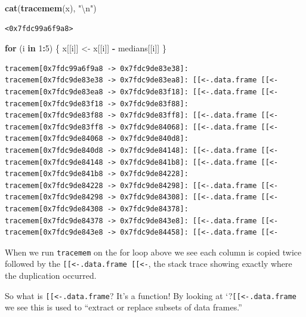 \documentclass[]{book}
\newenvironment{Shaded}{\begin{snugshade}}{\end{snugshade}}
\newcommand{\CharTok}[1]{\textcolor[rgb]{0.31,0.60,0.02}{#1}}
\newcommand{\ControlFlowTok}[1]{\textcolor[rgb]{0.13,0.29,0.53}{\textbf{#1}}}
\newcommand{\DecValTok}[1]{\textcolor[rgb]{0.00,0.00,0.81}{#1}}
\newcommand{\KeywordTok}[1]{\textcolor[rgb]{0.13,0.29,0.53}{\textbf{#1}}}
\newcommand{\NormalTok}[1]{#1}
\newcommand{\OperatorTok}[1]{\textcolor[rgb]{0.81,0.36,0.00}{\textbf{#1}}}
\newcommand{\StringTok}[1]{\textcolor[rgb]{0.31,0.60,0.02}{#1}}
\begin{document}
\begin{Shaded}
\begin{Highlighting}[]
\KeywordTok{cat}\NormalTok{(}\KeywordTok{tracemem}\NormalTok{(x), }\StringTok{"}\CharTok{\textbackslash{}n}\StringTok{"}\NormalTok{)}
\end{Highlighting}
\end{Shaded}

\begin{verbatim}
<0x7fdc99a6f9a8> 
\end{verbatim}

\begin{Shaded}
\begin{Highlighting}[]
\ControlFlowTok{for}\NormalTok{ (i }\ControlFlowTok{in} \DecValTok{1}\OperatorTok{:}\DecValTok{5}\NormalTok{) \{}
\NormalTok{  x[[i]] <-}\StringTok{ }\NormalTok{x[[i]] }\OperatorTok{-}\StringTok{ }\NormalTok{medians[[i]]}
\NormalTok{\}}
\end{Highlighting}
\end{Shaded}

\begin{verbatim}
tracemem[0x7fdc99a6f9a8 -> 0x7fdc9de83e38]: 
tracemem[0x7fdc9de83e38 -> 0x7fdc9de83ea8]: [[<-.data.frame [[<- 
tracemem[0x7fdc9de83ea8 -> 0x7fdc9de83f18]: [[<-.data.frame [[<- 
tracemem[0x7fdc9de83f18 -> 0x7fdc9de83f88]: 
tracemem[0x7fdc9de83f88 -> 0x7fdc9de83ff8]: [[<-.data.frame [[<- 
tracemem[0x7fdc9de83ff8 -> 0x7fdc9de84068]: [[<-.data.frame [[<- 
tracemem[0x7fdc9de84068 -> 0x7fdc9de840d8]: 
tracemem[0x7fdc9de840d8 -> 0x7fdc9de84148]: [[<-.data.frame [[<- 
tracemem[0x7fdc9de84148 -> 0x7fdc9de841b8]: [[<-.data.frame [[<- 
tracemem[0x7fdc9de841b8 -> 0x7fdc9de84228]: 
tracemem[0x7fdc9de84228 -> 0x7fdc9de84298]: [[<-.data.frame [[<- 
tracemem[0x7fdc9de84298 -> 0x7fdc9de84308]: [[<-.data.frame [[<- 
tracemem[0x7fdc9de84308 -> 0x7fdc9de84378]: 
tracemem[0x7fdc9de84378 -> 0x7fdc9de843e8]: [[<-.data.frame [[<- 
tracemem[0x7fdc9de843e8 -> 0x7fdc9de84458]: [[<-.data.frame [[<- 
\end{verbatim}

When we run \texttt{tracemem} on the for loop above we see each column is copied twice followed by the \texttt{{[}{[}\textless{}-.data.frame\ {[}{[}\textless{}-}, the stack trace showing exactly where the duplication occurred.

So what is \texttt{{[}{[}\textless{}-.data.frame}? It's a function! By looking at `?\texttt{{[}{[}\textless{}-.data.frame} we see this is used to ``extract or replace subsets of data frames.''
\end{document}
